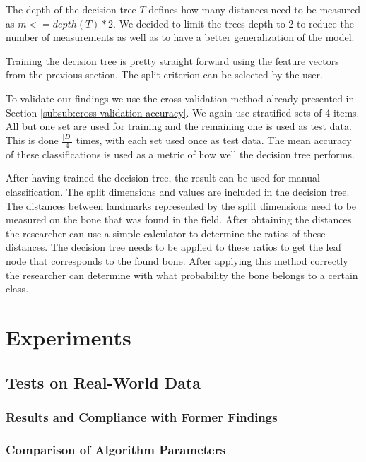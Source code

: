 \documentclass[pdftex,12pt,a4paper]{report}
\begin{document}
The depth of the decision tree $T$ defines how many distances need to be measured as $m <= depth(T) * 2$. We decided to limit the trees depth to 2 to reduce the number of measurements as well as to have a better generalization of the model.

Training the decision tree is pretty straight forward using the feature vectors from the previous section. The split criterion can be selected by the user.

To validate our findings we use the cross-validation method already presented in Section \ref{subsub:cross-validation-accuracy}. We again use stratified sets of 4 items. All but one set are used for training and the remaining one is used as test data. This is done $\frac{|D|}{4}$ times, with each set used once as test data. The mean accuracy of these classifications is used as a metric of how well the decision tree performs.

After having trained the decision tree, the result can be used for manual classification. The split dimensions and values are included in the decision tree. The distances between landmarks represented by the split dimensions need to be measured on the bone that was found in the field. After obtaining the distances the researcher can use a simple calculator to determine the ratios of these distances. The decision tree needs to be applied to these ratios to get the leaf node that corresponds to the found bone. After applying this method correctly the researcher can determine with what probability the bone belongs to a certain class.

\chapter{Experiments}

\section{Tests on Real-World Data}

\subsection{Results and Compliance with Former Findings}

\subsection{Comparison of Algorithm Parameters}
\label{sub:comparisonalgorithmparameters}
\end{document}
